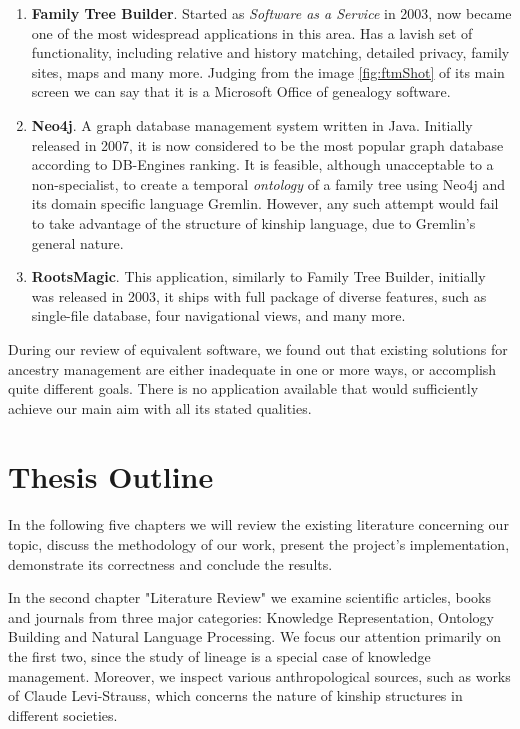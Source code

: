     \begin{enumerate}
        \item{\textbf{Family Tree Builder}. Started as \textit{Software as a Service} in 2003, now became one of the most
            widespread\cite{fambuild} applications in this area. Has a lavish set of functionality, including relative and history
            matching, detailed privacy, family sites, maps and many more. Judging from the image \ref{fig:ftmShot} of its main screen
            we can say that it is a Microsoft Office of genealogy software.}
        \item{\textbf{Neo4j}. A graph database management system\cite{neo4j} written in Java. Initially released in 2007, it is now considered
            to be the most popular graph database according to DB-Engines ranking\cite{rank}. It is feasible, although unacceptable to
            a non-specialist, to create a temporal \textit{ontology} of a family tree using Neo4j and its domain specific language
            Gremlin.  However, any such attempt would fail to take advantage of the structure of kinship language, due to Gremlin's
            general nature.}
        \item{\textbf{RootsMagic}. This application\cite{roots}, similarly to Family Tree Builder, initially was released in 2003, it
            ships with full package of diverse features, such as single-file database, four navigational views, and many more.}
    \end{enumerate}
    During our review of equivalent software, we found out that existing solutions for ancestry management are either inadequate in
    one or more ways, or accomplish quite different goals. There is no application available that would sufficiently achieve our
    main aim with all its stated qualities.

\section{Thesis Outline}
In the following five chapters we will review the existing literature concerning our topic, discuss the methodology of our work,
present the project's implementation, demonstrate its correctness and conclude the results.

In the second chapter "Literature Review" we examine scientific articles, books and journals from three major categories:
Knowledge Representation, Ontology Building and Natural Language Processing. We focus our attention primarily on the first two,
since the study of lineage is a special case of knowledge management. Moreover, we inspect various anthropological sources, such
as works of Claude Levi-Strauss\cite{strauss}, which concerns the nature of kinship structures in different societies.

